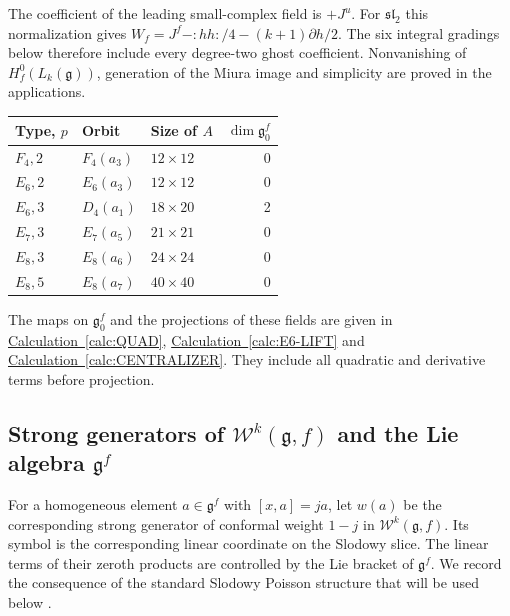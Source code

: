 \documentclass[11pt,a4paper]{amsart}
\numberwithin{equation}{section}
\theoremstyle{definition}
\theoremstyle{remark}
\newcommand{\g}{\mathfrak g}
\newcommand{\slg}{\mathfrak{sl}}
\begin{document}
The coefficient of the leading small-complex field is $+J^u$.
For $\slg_2$ this normalization gives
$W_f=J^f-:hh:/4-(k+1)\partial h/2$.
The six integral gradings below therefore include every degree-two
ghost coefficient. Nonvanishing of $H_f^0(L_k(\g))$, generation of the Miura image and simplicity
are proved in the applications.
\begin{center}\small
\begin{tabular}{@{}lllr@{}}\toprule
Type, $p$&Orbit&Size of $A$&$\dim\g_0^f$\\\midrule
$F_4,2$&$F_4(a_3)$&$12\times12$&0\\
$E_6,2$&$E_6(a_3)$&$12\times12$&0\\
$E_6,3$&$D_4(a_1)$&$18\times20$&2\\
$E_7,3$&$E_7(a_5)$&$21\times21$&0\\
$E_8,3$&$E_8(a_6)$&$24\times24$&0\\
$E_8,5$&$E_8(a_7)$&$40\times40$&0\\\bottomrule
\end{tabular}
\end{center}
The maps on $\g_0^f$ and the projections of these fields are given
in \hyperref[calc:QUAD]{Calculation~\ref*{calc:QUAD}},
\hyperref[calc:E6-LIFT]{Calculation~\ref*{calc:E6-LIFT}} and
\hyperref[calc:CENTRALIZER]{Calculation~\ref*{calc:CENTRALIZER}}.
They include all quadratic and derivative terms before projection.

\subsection{Strong generators of \texorpdfstring{$\mathcal W^k(\g,f)$}{Wk(g,f)} and the Lie algebra \texorpdfstring{$\g^f$}{g-f}}
For a homogeneous element $a\in\g^f$ with $[x,a]=ja$, let
$w(a)$ be the corresponding strong generator of conformal weight $1-j$ in
$\mathcal W^k(\g,f)$. Its symbol is the corresponding linear coordinate
on the Slodowy slice. The linear terms of their zeroth products are
controlled by the Lie bracket of $\g^f$. We record the consequence
of the standard Slodowy Poisson structure that will be used below
\cite[Sections~3.1--3.3 and Corollary~4.5.10(i)]{AAV}.
\end{document}
